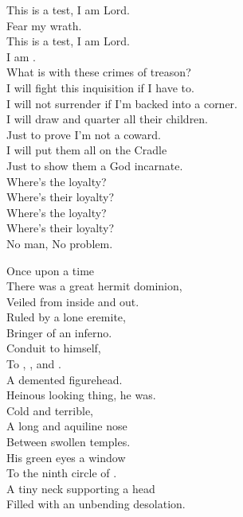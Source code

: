 This is a test, I am Lord. \\
Fear my wrath. \\
This is a test, I am Lord. \\
I am . \\

What is with these crimes of treason? \\
I will fight this inquisition if I have to. \\
I will not surrender if I'm backed into a corner. \\
I will draw and quarter all their children. \\
Just to prove I'm not a coward. \\
I will put them all on the  Cradle \\
Just to show them a God incarnate. \\

Where's the loyalty? \\
Where's their loyalty? \\
Where's the loyalty? \\
Where's their loyalty? \\
No man, No problem. \\





Once upon a time \\
There was a great hermit dominion, \\
Veiled from inside and out. \\
Ruled by a lone eremite, \\
Bringer of an inferno. \\
Conduit to  himself, \\
To , , and . \\
A demented figurehead. \\

Heinous looking thing, he was. \\
Cold and terrible, \\
A long and aquiline nose \\
Between swollen temples. \\
His green eyes a window \\
To the ninth circle of . \\
A tiny neck supporting a head \\
Filled with an unbending desolation. \\

